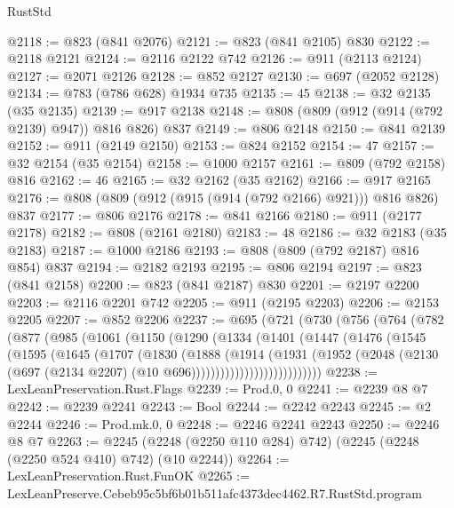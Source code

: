 \begin{lexlean}{RustStd}
\begin{coremodule}
@2118 := @823 (@841 @2076)
@2121 := @823 (@841 @2105) @830
@2122 := @2118 @2121
@2124 := @2116 @2122 @742
@2126 := @911 (@2113 @2124)
@2127 := @2071 @2126
@2128 := @852 @2127
@2130 := @697 (@2052 @2128)
@2134 := @783 (@786 @628) @1934 @735
@2135 := 45
@2138 := @32 @2135 (@35 @2135)
@2139 := @917 @2138
@2148 := @808 (@809 (@912 (@914 (@792 @2139) @947)) @816 @826) @837
@2149 := @806 @2148
@2150 := @841 @2139
@2152 := @911 (@2149 @2150)
@2153 := @824 @2152
@2154 := 47
@2157 := @32 @2154 (@35 @2154)
@2158 := @1000 @2157
@2161 := @809 (@792 @2158) @816
@2162 := 46
@2165 := @32 @2162 (@35 @2162)
@2166 := @917 @2165
@2176 := @808 (@809 (@912 (@915 (@914 (@792 @2166) @921))) @816 @826) @837
@2177 := @806 @2176
@2178 := @841 @2166
@2180 := @911 (@2177 @2178)
@2182 := @808 (@2161 @2180)
@2183 := 48
@2186 := @32 @2183 (@35 @2183)
@2187 := @1000 @2186
@2193 := @808 (@809 (@792 @2187) @816 @854) @837
@2194 := @2182 @2193
@2195 := @806 @2194
@2197 := @823 (@841 @2158)
@2200 := @823 (@841 @2187) @830
@2201 := @2197 @2200
@2203 := @2116 @2201 @742
@2205 := @911 (@2195 @2203)
@2206 := @2153 @2205
@2207 := @852 @2206
@2237 := @695
    (@721
      (@730
        (@756
          (@764
            (@782
              (@877
                (@985
                  (@1061
                    (@1150
                      (@1290
                        (@1334
                          (@1401
                            (@1447
                              (@1476
                                (@1545
                                  (@1595
                                    (@1645
                                      (@1707
                                        (@1830
                                          (@1888
                                            (@1914
                                              (@1931
                                                (@1952
                                                  (@2048
                                                    (@2130
                                                      (@697
                                                        (@2134 @2207)
                                                        (@10 @696)))))))))))))))))))))))))))
@2238 := LexLeanPreservation.Rust.Flags
@2239 := Prod.{0, 0}
@2241 := @2239 @8 @7
@2242 := @2239 @2241
@2243 := Bool
@2244 := @2242 @2243
@2245 := @2 @2244
@2246 := Prod.mk.{0, 0}
@2248 := @2246 @2241 @2243
@2250 := @2246 @8 @7
@2263 := @2245 (@2248 (@2250 @110 @284) @742) (@2245 (@2248 (@2250 @524 @410) @742) (@10 @2244))
@2264 := LexLeanPreservation.Rust.FunOK
@2265 := LexLeanPreserve.Cebeb95c5bf6b01b511afc4373dec4462.R7.RustStd.program

\end{coremodule}
\end{lexlean}
